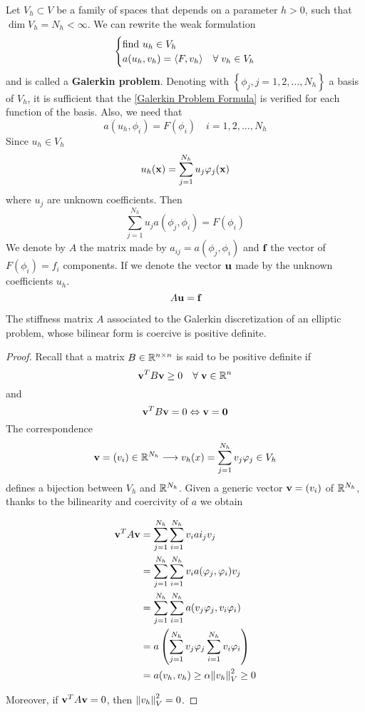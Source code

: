 Let \(V_h \subset V\) be a family of spaces that depends on a parameter \(h > 0\), such that \(\dim V_h = N_h < \infty\).
We can rewrite the weak formulation 
\begin{equation}
    \begin{cases}
        \text{find } u_h \in V_h\\
        a(u_h,v_h) = \langle F,v_h \rangle & \forall \; v_h \in V_h \label{Galerkin Problem Formula}
    \end{cases}
\end{equation}
and is called a \textbf{Galerkin problem}. Denoting with \(\left\{\phi_j, j = 1,2,\ldots,N_h\right\}\) a basis of \(V_h\), it is sufficient that the \eqref{Galerkin Problem Formula} is verified for each function of the basis. 
Also, we need that 
\[
    a(u_h, \phi_i) = F(\phi_i) \quad i = 1, 2, \ldots , N_h
\]
Since \(u_h \in V_h\)
\[
    u_h(\textbf{x})=\sum_{j=1}^{N_h} u_j \varphi_j(\textbf{x})
\]
where \(u_j\) are unknown coefficients. Then
\[
    \sum_{j=1}^{N_h}u_j a(\phi_j, \phi_i) = F(\phi_i)
\]
We denote by \(A\) the matrix made by \(a_{ij} = a(\phi_j, \phi_i)\) and \(\textbf{f}\) the vector of \(F(\phi_i) = f_i\) components. If we denote the vector \(\textbf{u}\) made by the unknown coefficients \(u_h\).
\begin{equation}
    A\textbf{u} = \textbf{f}
    \label{Linear system Galerkin}
\end{equation}

    \begin{theorem}
    The stiffness matrix \(A\) associated to the Galerkin discretization of an elliptic problem, whose bilinear form is coercive is positive definite.
\end{theorem}
\begin{proof}
    Recall that a matrix \(B \in \mathbb{R}^{n\times n}\) is said to be positive definite if 
    \[
        \textbf{v}^TB\textbf{v} \geq 0 \quad \forall \; \textbf{v} \in \mathbb{R}^n
    \]
    and
    \[
        \textbf{v}^T B \textbf{v} = 0 \Leftrightarrow \textbf{v} = \textbf{0}
    \]
    The correspondence 
    \[
        \textbf{v} = (v_i) \in \mathbb{R}^{N_h} \longrightarrow v_h(x) = \sum_{j=1}^{N_h} v_j\varphi_j \in V_h
    \]
    defines a bijection between \(V_h\) and \(\mathbb{R}^{N_h}\). Given a generic vector \(\textbf{v} = (v_i)\) of \(\mathbb{R}^{N_h}\), thanks to the bilinearity and coercivity of \(a\) we obtain 
    
        \begin{align*}
        \textbf{v}^T A \textbf{v} & = \sum_{j=1}^{N_h}\sum_{i=1}^{N_h} v_i ai_j v_j \\
        & = \sum_{j=1}^{N_h}\sum_{i=1}^{N_h} v_ia(\varphi_j, \varphi_i)v_j\\
        & = \sum_{j=1}^{N_h}\sum_{i=1}^{N_h} a(v_j\varphi_j, v_i \varphi_i)\\
        & = a\left(\sum_{j=1}^{N_h}v_j\varphi_j\sum_{i=1}^{N_h}v_i\varphi_i\right)\\
        & = a(v_h,v_h) \geq \alpha \norm{v_h}_V^2 \geq 0
        \end{align*}

    Moreover, if \(\textbf{v}^T A \textbf{v} = 0\), then \(\norm{v_h}_V^2 = 0\).
\end{proof}


